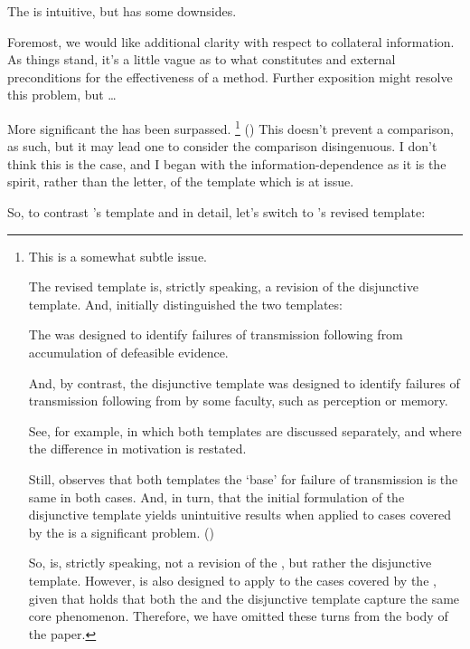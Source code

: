 \begin{note}
  The \widt{} is intuitive, but has some downsides.

  Foremost, we would like additional clarity with respect to collateral information.
  As things stand, it's a little vague as to what constitutes and external preconditions for the effectiveness of a method.
  Further exposition might resolve this problem, but \dots

  More significant the \widt{} has been surpassed.\nolinebreak
  \footnote{
    This is a somewhat subtle issue.

    The revised template is, strictly speaking, a revision of the disjunctive template.
    And, \citeauthor{Wright:2002uk} initially distinguished the two templates:

    The \widt{} was designed to identify failures of transmission following from accumulation of defeasible evidence.

    And, by contrast, the disjunctive template was designed to identify failures of transmission following from by some faculty, such as perception or memory.

    See, for example, \textcite{Wright:2002uk} in which both templates are discussed separately, and \textcite[91]{Wright:2011wn} where the difference in motivation is restated.

    Still, \citeauthor{Wright:2011wn} observes that both templates the `base' for failure of transmission is the same in both cases.
    And, in turn, that the initial formulation of the disjunctive template yields unintuitive results when applied to cases covered by the \widt{} is a significant problem.
    (\Citeyear[91]{Wright:2011wn})

    So, \wrt{} is, strictly speaking, not a revision of the \widt{}, but rather the disjunctive template.
    However, \wrt{} is also designed to apply to the cases covered by the \widt{}, given that \citeauthor{Wright:2011wn}
    holds that both the \widt{} and the disjunctive template capture the same core phenomenon.
    Therefore, we have omitted these turns from the body of the paper.
  }
  (\Citeyear[90]{Wright:2011wn})
  This doesn't prevent a comparison, as such, but it may lead one to consider the comparison disingenuous.
  I don't think this is the case, and I began with the information-dependence as it is the spirit, rather than the letter, of the template which is at issue.

  So, to contrast \citeauthor{Wright:2000tq}'s template and \nI{} in detail, let's switch to \citeauthor{Wright:2011wn}'s revised template:


\end{note}
